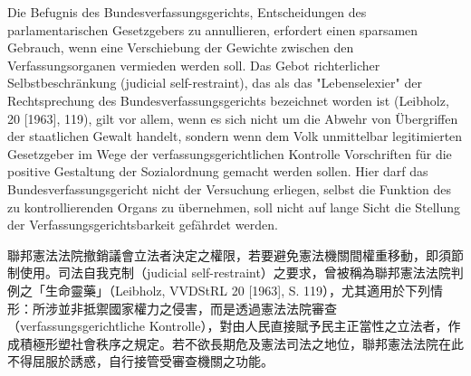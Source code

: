 \documentclass[12pt]{article}
\begin{document}
\syncleft
\begin{sourcepara}
Die Befugnis des Bundesverfassungsgerichts, Entscheidungen des parlamentarischen Gesetzgebers zu annullieren, erfordert einen sparsamen Gebrauch, wenn eine Verschiebung der Gewichte zwischen den Verfassungsorganen vermieden werden soll. Das Gebot richterlicher Selbstbeschränkung (judicial self-restraint), das als das "Lebenselexier" der Rechtsprechung des Bundesverfassungsgerichts bezeichnet worden ist (Leibholz, \abbrVVDStRL{} 20 [1963], \abbrS{} 119), gilt vor allem, wenn es sich nicht um die Abwehr von Übergriffen der staatlichen Gewalt handelt, sondern wenn dem Volk unmittelbar legitimierten Gesetzgeber im Wege der verfassungsgerichtlichen Kontrolle Vorschriften für die positive Gestaltung der Sozialordnung gemacht werden sollen. Hier darf das Bundesverfassungsgericht nicht der Versuchung erliegen, selbst die Funktion des zu kontrollierenden Organs zu übernehmen, soll nicht auf lange Sicht die Stellung der Verfassungsgerichtsbarkeit gefährdet werden.
\end{sourcepara}
\begin{transpara}
聯邦憲法法院撤銷議會立法者決定之權限，若要避免憲法機關間權重移動，即須節制使用。司法自我克制（judicial self-restraint）之要求，曾被稱為聯邦憲法法院判例之「生命靈藥」（Leibholz, VVDStRL 20 [1963], S. 119），尤其適用於下列情形：所涉並非抵禦國家權力之侵害，而是透過憲法法院審查（verfassungsgerichtliche Kontrolle），對由人民直接賦予民主正當性之立法者，作成積極形塑社會秩序之規定。若不欲長期危及憲法司法之地位，聯邦憲法法院在此不得屈服於誘惑，自行接管受審查機關之功能。
\end{transpara}
\end{document}
